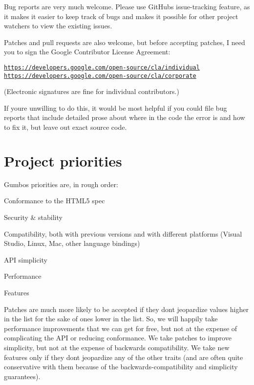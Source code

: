 Bug reports are very much welcome. Please use Git\+Hub\textquotesingle{}s issue-\/tracking feature, as it makes it easier to keep track of bugs and makes it possible for other project watchers to view the existing issues.

Patches and pull requests are also welcome, but before accepting patches, I need you to sign the Google Contributor License Agreement\+:

\href{https://developers.google.com/open-source/cla/individual}{\tt https\+://developers.\+google.\+com/open-\/source/cla/individual} \href{https://developers.google.com/open-source/cla/corporate}{\tt https\+://developers.\+google.\+com/open-\/source/cla/corporate}

(Electronic signatures are fine for individual contributors.)

If you\textquotesingle{}re unwilling to do this, it would be most helpful if you could file bug reports that include detailed prose about where in the code the error is and how to fix it, but leave out exact source code.

\section*{Project priorities }

Gumbo\textquotesingle{}s priorities are, in rough order\+:


\begin{DoxyEnumerate}
\item Conformance to the H\+T\+M\+L5 spec
\item Security \& stability
\item Compatibility, both with previous versions and with different platforms (Visual Studio, Linux, Mac, other language bindings)
\item A\+PI simplicity
\item Performance
\item Features
\end{DoxyEnumerate}

Patches are much more likely to be accepted if they don\textquotesingle{}t jeopardize values higher in the list for the sake of ones lower in the list. So, we will happily take performance improvements that we can get for free, but not at the expense of complicating the A\+PI or reducing conformance. We take patches to improve simplicity, but not at the expense of backwards compatibility. We take new features only if they don\textquotesingle{}t jeopardize any of the other traits (and are often quite conservative with them because of the backwards-\/compatibility and simplicity guarantees).

